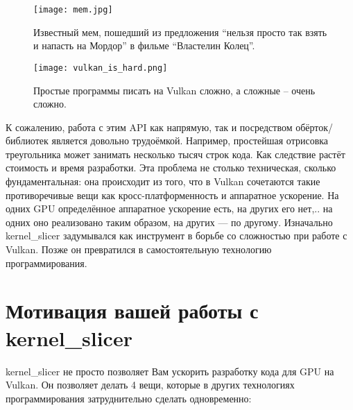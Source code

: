 \documentclass[11pt,fleqn,english,russian]{report} %
\begin{document}
\begin{figure}[h]
\begin{minipage}{0.45\textwidth}
	\centering
	\texttt{[image: mem.jpg]}
	\caption{Известный мем, пошедший из предложения ``нельзя просто так взять и напасть на Мордор'' в фильме ``Властелин Колец''.}
	\label{fig:mem}
\end{minipage}
\hfill
\begin{minipage}{0.45\textwidth}
	\centering
	\texttt{[image: vulkan\_is\_hard.png]}
	\caption{Простые программы писать на Vulkan сложно, а сложные -- очень сложно.}
	\label{fig:vulkan_complexity}
\end{minipage}
\end{figure}


К сожалению, работа с этим API как напрямую, так и посредством обёрток/библиотек является довольно трудоёмкой. Например, простейшая отрисовка треугольника может занимать несколько тысяч строк кода. Как следствие растёт стоимость и время разработки. Эта проблема не столько техническая, сколько фундаментальная: она происходит из того, что в Vulkan сочетаются такие противоречивые вещи как кросс-платформенность и аппаратное ускорение. На одних GPU определённое аппаратное ускорение есть, на других его нет,.. на одних оно реализовано таким образом, на других --- по другому. Изначально kernel\_slicer задумывался как инструмент в борьбе со сложностью при работе с Vulkan. Позже он превратился в самостоятельную технологию программирования.

\section{Мотивация вашей работы с kernel\_slicer }

kernel\_slicer не просто позволяет Вам ускорить разработку кода для GPU на Vulkan. Он позволяет делать 4 вещи, которые в других технологиях программирования затруднительно сделать одновременно:
\end{document}
